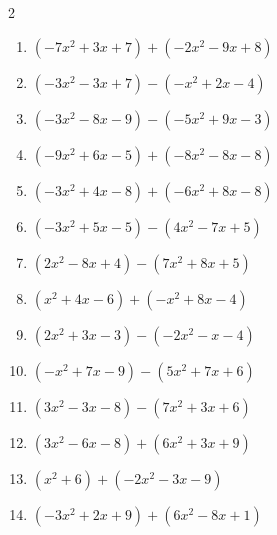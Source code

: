 \begin{multicols}{2}
\begin{enumerate}
  \item $(-7x^{2}+3x+7)+(-2x^{2}-9x+8)$


  \item $(-3x^{2}-3x+7)-(-x^{2}+2x-4)$


  \item $(-3x^{2}-8x-9)-(-5x^{2}+9x-3)$


  \item $(-9x^{2}+6x-5)+(-8x^{2}-8x-8)$


  \item $(-3x^{2}+4x-8)+(-6x^{2}+8x-8)$


  \item $(-3x^{2}+5x-5)-(4x^{2}-7x+5)$


  \item $(2x^{2}-8x+4)-(7x^{2}+8x+5)$


  \item $(x^{2}+4x-6)+(-x^{2}+8x-4)$

        \phantom{$=12x-10$}

  \item $(2x^{2}+3x-3)-(-2x^{2}-x-4)$


  \item $(-x^{2}+7x-9)-(5x^{2}+7x+6)$


  \item $(3x^{2}-3x-8)-(7x^{2}+3x+6)$


  \item $(3x^{2}-6x-8)+(6x^{2}+3x+9)$


\columnbreak %

  \item $(x^{2}+6)+(-2x^{2}-3x-9)$


  \item $(-3x^{2}+2x+9)+(6x^{2}-8x+1)$


\end{enumerate}
\end{multicols}
